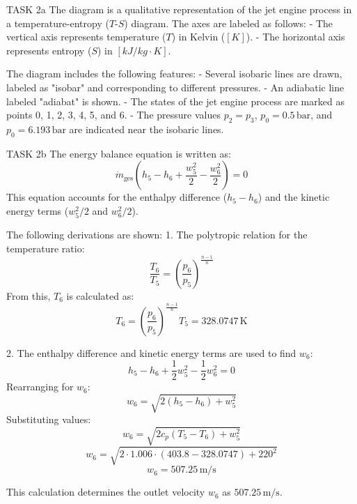 TASK 2a  
The diagram is a qualitative representation of the jet engine process in a temperature-entropy (\(T\)-\(S\)) diagram. The axes are labeled as follows:  
- The vertical axis represents temperature (\(T\)) in Kelvin (\([K]\)).  
- The horizontal axis represents entropy (\(S\)) in \([kJ/kg·K]\).  

The diagram includes the following features:  
- Several isobaric lines are drawn, labeled as "isobar" and corresponding to different pressures.  
- An adiabatic line labeled "adiabat" is shown.  
- The states of the jet engine process are marked as points 0, 1, 2, 3, 4, 5, and 6.  
- The pressure values \(p_2 = p_3\), \(p_0 = 0.5 \, \text{bar}\), and \(p_0 = 6.193 \, \text{bar}\) are indicated near the isobaric lines.  

TASK 2b  
The energy balance equation is written as:  
\[
\dot{m}_{\text{ges}} \left( h_5 - h_6 + \frac{w_5^2}{2} - \frac{w_6^2}{2} \right) = 0
\]  
This equation accounts for the enthalpy difference (\(h_5 - h_6\)) and the kinetic energy terms (\(w_5^2/2\) and \(w_6^2/2\)).  

The following derivations are shown:  
1. The polytropic relation for the temperature ratio:  
\[
\frac{T_6}{T_5} = \left( \frac{p_6}{p_5} \right)^{\frac{n-1}{n}}
\]  
From this, \(T_6\) is calculated as:  
\[
T_6 = \left( \frac{p_6}{p_5} \right)^{\frac{n-1}{n}} T_5 = 328.0747 \, \text{K}
\]  

2. The enthalpy difference and kinetic energy terms are used to find \(w_6\):  
\[
h_5 - h_6 + \frac{1}{2} w_5^2 - \frac{1}{2} w_6^2 = 0
\]  
Rearranging for \(w_6\):  
\[
w_6 = \sqrt{2 \left( h_5 - h_6 \right) + w_5^2}
\]  
Substituting values:  
\[
w_6 = \sqrt{2 c_p \left( T_5 - T_6 \right) + w_5^2}
\]  
\[
w_6 = \sqrt{2 \cdot 1.006 \cdot (403.8 - 328.0747) + 220^2}
\]  
\[
w_6 = 507.25 \, \text{m/s}
\]  

This calculation determines the outlet velocity \(w_6\) as \(507.25 \, \text{m/s}\).